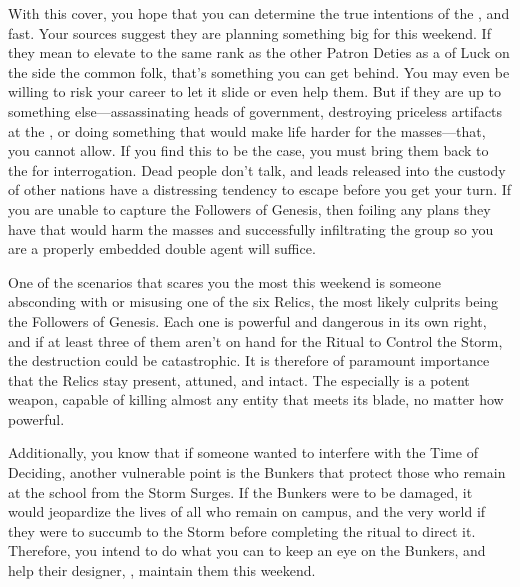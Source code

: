 \documentclass[char]{GL2020}
\begin{document}
With this cover, you hope that you can determine the true intentions of the \pGoaties{}, and fast. Your sources suggest they are planning something big for this weekend. If they mean to elevate \cGenesis{} to the same rank as the other Patron Deties as a \cGenesis{\Deity} of Luck on the side the common folk, that's something you can get behind. You may even be willing to risk your career to let it slide or even help them. But if they are up to something else---assassinating heads of government, destroying priceless artifacts at the \pSchool{}, or doing something that would make life harder for the masses---that, you cannot allow. If you find this to be the case, you must bring them back to the \pFarm{} for interrogation. Dead people don't talk, and leads released into the custody of other nations have a distressing tendency to escape before you get your turn. If you are unable to capture the Followers of Genesis, then foiling any plans they have that would harm the masses and successfully infiltrating the group so you are a properly embedded double agent will suffice.

One of the scenarios that scares you the most this weekend is someone absconding with or misusing one of the six Relics, the most likely culprits being the Followers of Genesis. Each one is powerful and dangerous in its own right, and if at least three of them aren't on hand for the Ritual to Control the Storm, the destruction could be catastrophic. It is therefore of paramount importance that the Relics stay present, attuned, and intact. The \iScythe{} especially is a potent weapon, capable of killing almost any entity that meets its blade, no matter how powerful.

Additionally, you know that if someone wanted to interfere with the Time of Deciding, another vulnerable point is the Bunkers that protect those who remain at the school from the Storm Surges. If the Bunkers were to be damaged, it would jeopardize the lives of all who remain on campus, and the very world if they were to succumb to the Storm before completing the ritual to direct it. Therefore, you intend to do what you can to keep an eye on the Bunkers, and help their designer, \cBunker{\full}, maintain them this weekend.
\end{document}
